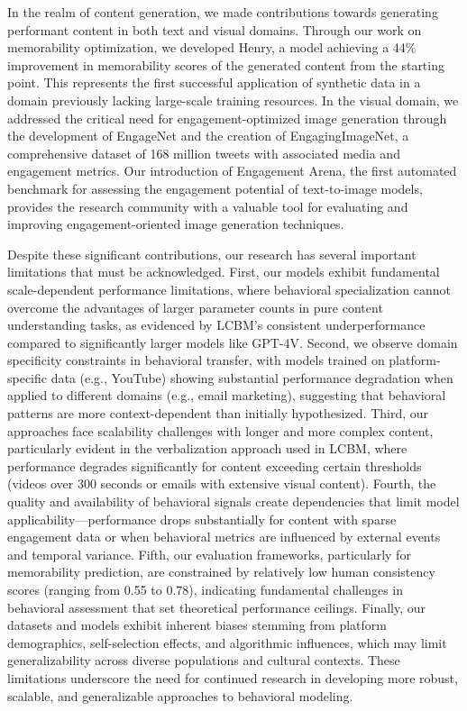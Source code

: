 In the realm of content generation, we made contributions towards generating performant content in both text and visual domains. Through our work on memorability optimization, we developed Henry, a model achieving a 44\% improvement in memorability scores of the generated content from the starting point. This represents the first successful application of synthetic data in a domain previously lacking large-scale training resources. In the visual domain, we addressed the critical need for engagement-optimized image generation through the development of EngageNet and the creation of EngagingImageNet, a comprehensive dataset of 168 million tweets with associated media and engagement metrics. Our introduction of Engagement Arena, the first automated benchmark for assessing the engagement potential of text-to-image models, provides the research community with a valuable tool for evaluating and improving engagement-oriented image generation techniques.


Despite these significant contributions, our research has several important limitations that must be acknowledged. First, our models exhibit fundamental scale-dependent performance limitations, where behavioral specialization cannot overcome the advantages of larger parameter counts in pure content understanding tasks, as evidenced by LCBM's consistent underperformance compared to significantly larger models like GPT-4V. Second, we observe domain specificity constraints in behavioral transfer, with models trained on platform-specific data (e.g., YouTube) showing substantial performance degradation when applied to different domains (e.g., email marketing), suggesting that behavioral patterns are more context-dependent than initially hypothesized. Third, our approaches face scalability challenges with longer and more complex content, particularly evident in the verbalization approach used in LCBM, where performance degrades significantly for content exceeding certain thresholds (videos over 300 seconds or emails with extensive visual content). Fourth, the quality and availability of behavioral signals create dependencies that limit model applicability—performance drops substantially for content with sparse engagement data or when behavioral metrics are influenced by external events and temporal variance. Fifth, our evaluation frameworks, particularly for memorability prediction, are constrained by relatively low human consistency scores (ranging from 0.55 to 0.78), indicating fundamental challenges in behavioral assessment that set theoretical performance ceilings. Finally, our datasets and models exhibit inherent biases stemming from platform demographics, self-selection effects, and algorithmic influences, which may limit generalizability across diverse populations and cultural contexts. These limitations underscore the need for continued research in developing more robust, scalable, and generalizable approaches to behavioral modeling.

